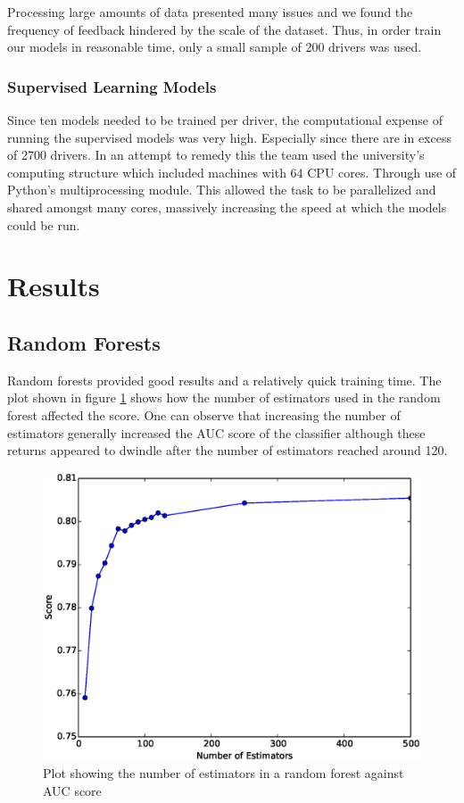 \documentclass[a4paper, 11pt, twocolumn]{report}
\begin{document}
Processing large amounts of data presented many issues and we found the frequency of feedback hindered by the scale of the dataset.
Thus, in order train our models in reasonable time, only a small sample of 200 drivers was used.

\subsubsection{Supervised Learning Models}
Since ten models needed to be trained per driver, the computational expense of running the supervised models was very high. Especially since there are in excess of 2700 drivers. In an attempt to remedy this the team used the university's computing structure which included machines with 64 CPU cores. Through use of Python's multiprocessing module. This allowed the task to be parallelized and shared amongst many cores, massively increasing the speed at which the models could be run.



\section{Results}
\subsection{Random Forests}
Random forests provided good results and a relatively quick training time. 
The plot shown in figure \ref{fig:rfperf} shows how the number of estimators used in the random forest affected the score. 
One can observe that increasing the number of estimators generally increased the AUC score of the classifier although these returns appeared to dwindle after the number of estimators reached around 120.

\begin{figure}[h]
    \center
    \includegraphics[width=\linewidth]{img/rfperf}
    \caption{Plot showing the number of estimators in a random forest against AUC score}
    \label{fig:rfperf}
\end{figure}
\end{document}
